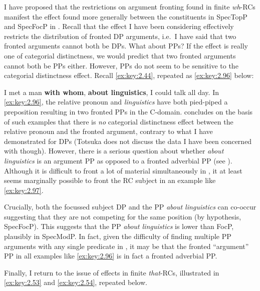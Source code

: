 \documentclass[output=paper]{langsci/langscibook}
\begin{document}
I have proposed that the restrictions on argument fronting found in finite
\emph{wh}{-}RCs manifest the  effect found more
generally between the constituents in SpecTopP and SpecFocP in . Recall
that the  effect I have been considering effectively
restricts the distribution of fronted DP arguments, i.e.\ I have said that two
fronted arguments cannot both be DPs. What about PPs? If the effect is really
one of categorial distinctness, we would predict that two fronted arguments
cannot both be PPs either. However, PPs do not seem to be sensitive to the
categorial distinctness effect. Recall \eqref{ex:key:2.44}, repeated as \eqref{ex:key:2.96} below:

\ea\label{ex:key:2.96}
    I met a man \textbf{with whom}, \textbf{about linguistics}, I could talk all day.
\z
In \eqref{ex:key:2.96}, the relative pronoun and \emph{linguistics} have both pied-piped a
preposition resulting in two fronted PPs in the C-domain. \textcite{Totsuka2014}
concludes on the basis of such examples that there is \emph{no} categorial
distinctness effect between the relative pronoun and the fronted argument,
contrary to what I have demonstrated for DPs (Totsuka does not discuss the data
I have been concerned with though). However, there is a serious question about
whether \emph{about linguistics} is an argument PP as opposed to a fronted
adverbial PP (see \citealt[294, 322--325]{Rizzi1997}). Although it is difficult
to front a lot of material simultaneously in , it at least seems
marginally possible to front the \gls{RC} subject in an example like \eqref{ex:key:2.97}.

\label{ex:key:2.97}
\z
Crucially, both the focussed subject DP and the PP \emph{about linguistics} can
co-occur suggesting that they are not competing for the same position (by
hypothesis, SpecFocP). This suggests that the PP \emph{about linguistics} is
lower than FocP, plausibly in SpecModP. In fact, given the difficulty of
finding multiple PP arguments with any single predicate in , it may be
that the fronted \enquote{argument} PP in all examples like \eqref{ex:key:2.96} is in fact a
fronted adverbial PP\@.

Finally, I return to the issue of  effects in finite
\emph{that}{-RCs,} illustrated in \eqref{ex:key:2.53} and \eqref{ex:key:2.54},
repeated below.
\end{document}
